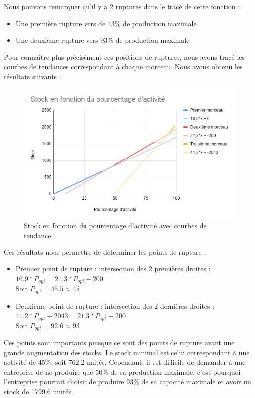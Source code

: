 \documentclass{article}
\begin{document}
Nous pouvons remarquer qu'il y a 2 ruptures dans le tracé de cette fonction : 
\begin{itemize}
\item Une première rupture vers de 43\% de production maximale
\item Une deuxième rupture vers 93\% de production maximale
\end{itemize}

Pour connaître plus précisément ces positions de ruptures, nous avons tracé les courbes de tendances correspondant à chaque morceau. Nous avons obtenu les résultats suivants :

\begin{center}
\begin{figure}[H]
\includegraphics[width=1\textwidth]{img/Stock_Activite_tendance}
\caption{Stock en fonction du pourcentage d'activité avec courbes de tendance}
\end{figure}
\end{center}

Ces résultats nous permettre de déterminer les points de rupture :
\begin{itemize}
\item Premier point de rupture : intersection des 2 premières droites :\\
$16.9*P_{opt} = 21.3*P_{opt} - 200$ \\
Soit $P_{opt} = 45.5 \approx 45 $
\item Deuxième point de rupture : intersection des 2 dernières droites :\\
$41.2*P_{opt}-2043 = 21.3*P_{opt} - 200$ \\
Soit $P_{opt} = 92.6 \approx 93 $
\end{itemize}

Ces points sont importants puisque ce sont des points de rupture avant une grande augmentation des stocks. Le stock minimal est celui correspondant à une activité de 45\%, soit 762.2 unités. Cependant, il est difficile de demander à une entreprise de ne produire que 50\% de sa production maximale, c'est pourquoi l'entreprise pourrait choisir de produire 93\% de sa capacité maximale et avoir un stock de 1799.6 unités. \\
\end{document}
